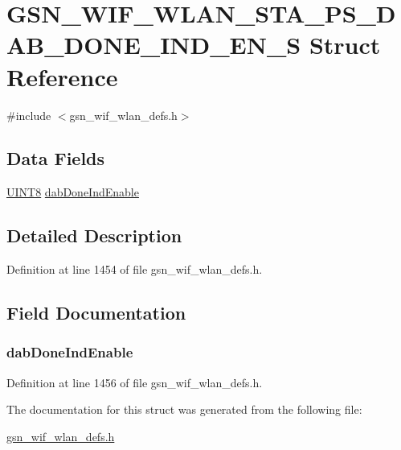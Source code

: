 \hypertarget{a00404}{
\section{GSN\_\-WIF\_\-WLAN\_\-STA\_\-PS\_\-DAB\_\-DONE\_\-IND\_\-EN\_\-S Struct Reference}
\label{a00404}
}


{\ttfamily \#include $<$gsn\_\-wif\_\-wlan\_\-defs.h$>$}

\subsection*{Data Fields}
\begin{DoxyCompactItemize}
\item 
\hyperlink{a00660_gab27e9918b538ce9d8ca692479b375b6a}{UINT8} \hyperlink{a00404_a8e8688e32a0adf1b4f08e075e6ad0108}{dabDoneIndEnable}
\end{DoxyCompactItemize}


\subsection{Detailed Description}


Definition at line 1454 of file gsn\_\-wif\_\-wlan\_\-defs.h.



\subsection{Field Documentation}
\hypertarget{a00404_a8e8688e32a0adf1b4f08e075e6ad0108}{
\subsubsection[{dabDoneIndEnable}]{ {\bf dabDoneIndEnable}}}
\label{a00404_a8e8688e32a0adf1b4f08e075e6ad0108}


Definition at line 1456 of file gsn\_\-wif\_\-wlan\_\-defs.h.



The documentation for this struct was generated from the following file:\begin{DoxyCompactItemize}
\item 
\hyperlink{a00613}{gsn\_\-wif\_\-wlan\_\-defs.h}\end{DoxyCompactItemize}
